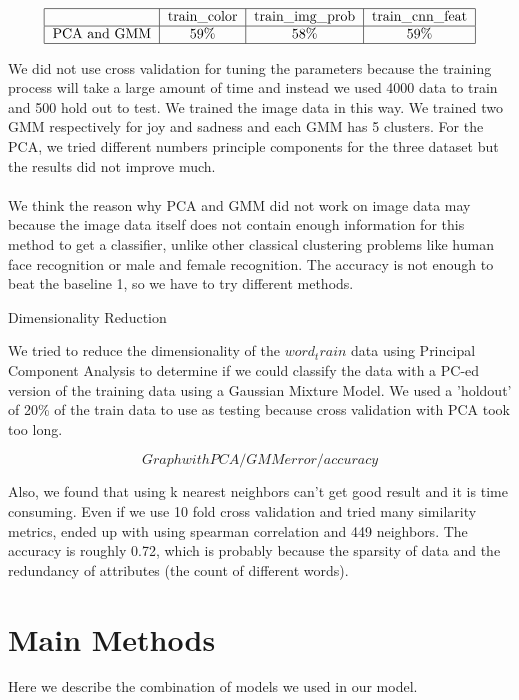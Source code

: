 \documentclass[]{article}
\begin{document}
\[
\begin{tabular}{|c|c|c|c|}
\hline &train\_color & train\_img\_prob & train\_cnn\_feat\\
\hline PCA and GMM&59\%&58\%&59\%\\
\hline
\end{tabular}
\]

We did not use cross validation for tuning the parameters because the training process will take a large amount of time and instead we used 4000 data to train and 500 hold out to test. We trained the image data in this way. We trained two GMM respectively for joy and sadness and each GMM has 5 clusters. For the PCA, we tried different numbers principle components for the three dataset but the results did not improve much.\\\\

We think the reason why PCA and GMM did not work on image data may because the image data itself does not contain enough information for this method to get a classifier, unlike other classical clustering problems like human face recognition or male and female recognition. The accuracy is not enough to beat the baseline 1, so we have to try different methods.

Dimensionality Reduction

We tried to reduce the dimensionality of the $word_train$ data using Principal Component Analysis to determine if we could classify the data with a PC-ed version of the training data using a Gaussian Mixture Model. We used a 'holdout' of 20\% of the train data to use as testing because cross validation with PCA took too long.  

$$Graph with PCA/GMM error/accuracy$$

Also, we found that using k nearest neighbors can't get good result and it is time consuming. Even if we use 10 fold cross validation and tried many similarity metrics, ended up with using spearman correlation and 449 neighbors. The accuracy is roughly 0.72, which is probably because the sparsity of data and the redundancy of attributes (the count of different words).
 


\section{Main Methods}

Here we describe the combination of models we used in our model. 
\end{document}
